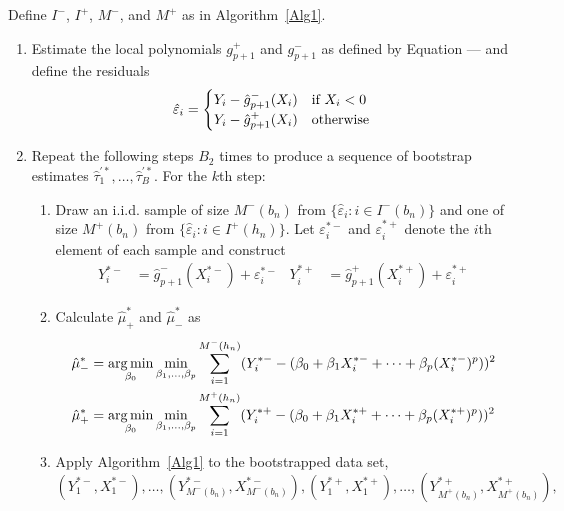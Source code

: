 \documentclass[12pt,fleqn]{article}
\begin{document}
\begin{algorithm}\label{Alg2}
  Define $I^-$, $I^+$, $M^-$, and $M^+$ as in Algorithm~\ref{Alg1}.
  \begin{enumerate}
  \item Estimate the local polynomials $g_{p+1}^+$ and $g_{p+1}^-$ as defined by
    Equation --- and define the residuals
    \begin{equation}
      \label{eq:6}
      \hat\varepsilon_i =
      \begin{cases}
        Y_i - \hat g_{p+1}^-(X_i) & \text{if}\ X_i < 0 \\
        Y_i - \hat g_{p+1}^+(X_i) & \text{otherwise}
      \end{cases}
    \end{equation}
  \item Repeat the following steps $B_2$ times to produce a sequence of bootstrap
    estimates $\hat\tau_1^{\prime*},\dots,\hat\tau_B^{\prime*}$. For the $k$th step:
    \begin{enumerate}
    \item Draw an i.i.d. sample of size $M^-(b_n)$ from
      $\{\hat\varepsilon_i : i \in I^-(b_n)\}$ and one of size $M^+(b_n)$ from
      $\{\hat\varepsilon_i : i \in I^+(h_n)\}$. Let $\varepsilon_i^{*-}$ and
      $\varepsilon_i^{*+}$ denote the $i$th element of each sample and construct
      \begin{align}
        \label{eq:2}
        Y_i^{*-} &= \hat g_{p+1}^-(X_i^{*-}) + \varepsilon_i^{*-} &
        Y_i^{*+} &= \hat g_{p+1}^+(X_i^{*+}) + \varepsilon_i^{*+}
      \end{align}
    \item Calculate $\hat\mu_+^*$ and $\hat\mu_-^*$ as
      \begin{align}
        \hat\mu_-^*
        &= \operatorname*{arg\,min}_{\beta_0} \min_{\beta_1,\dots,\beta_p}
          \sum_{i = 1}^{M^-(h_n)} (Y_i^{*-} -
          (\beta_0 + \beta_1 X_i^{*-} + \cdots + \beta_p (X_i^{*-})^p))^2 \\
        \hat\mu_+^*
        &= \operatorname*{arg\,min}_{\beta_0} \min_{\beta_1,\dots,\beta_p}
          \sum_{i = 1}^{M^+(h_n)} (Y_i^{*+} -
          (\beta_0 + \beta_1 X_i^{*+} + \cdots + \beta_p (X_i^{*+})^p))^2
      \end{align}
    \item Apply Algorithm~\ref{Alg1} to the bootstrapped data set,
      \begin{equation*}
        (Y_1^{*-}, X_1^{*-}),\dots,(Y_{M^-(b_n)}^{*-},X_{M^-(b_n)}^{*-}),
        (Y_1^{*+}, X_1^{*+}),\dots,(Y_{M^+(b_n)}^{*+},X_{M^+(b_n)}^{*+}),

\end{equation*}
\end{enumerate}
\end{enumerate}
\end{algorithm}
\end{document}
